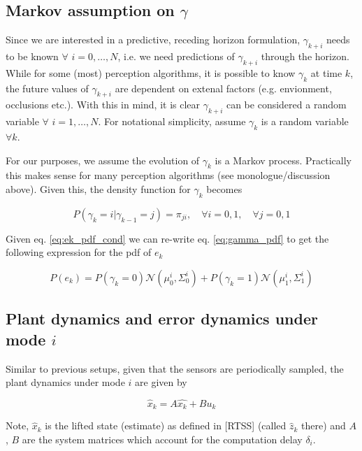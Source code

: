 \documentclass{article}[14pt]
\begin{document}
	\subsection{Markov assumption on $\gamma$}

	Since we are interested in a predictive, receding horizon formulation, $\gamma_{k+i}$ needs to be known $\forall$ $i=0,\dotsc,N$, i.e. we need predictions of $\gamma_{k+i}$ through the horizon. While for some (most) perception algorithms, it is possible to know $\gamma_k$ at time $k$, the future values of $\gamma_{k+i}$ are dependent on extenal factors (e.g. envionment, occlusions etc.). With this in mind, it is clear $\gamma_{k+i}$ can be considered a random variable $\forall$ $i=1,\dotsc,N$. For notational simplicity, assume $\gamma_k$ is a random variable $\forall k$. 

	For our purposes, we assume the evolution of $\gamma_k$ is a Markov process. Practically this makes sense for many perception algorithms (see monologue/discussion above). Given this, the density function for $\gamma_k$ becomes

	\begin{equation}
		P(\gamma_k=i|\gamma_{k-1}=j) = \pi_{ji}, \quad \forall i=0,1,\quad \forall j=0,1
		\label{eq:gamma_pdf}
	\end{equation}

	Given eq. \ref{eq:ek_pdf_cond} we can re-write eq. \ref{eq:gamma_pdf} to get the following expression for the pdf of $e_k$

	\begin{equation}
		P(e_k) = P(\gamma_k=0)\mathcal{N}(\mu^i_0,\Sigma^i_0) + P(\gamma_k=1)\mathcal{N}(\mu^i_1,\Sigma^i_1)
		\label{eq:ek_pdf_exp}
	\end{equation}

	\subsection{Plant dynamics and error dynamics under mode $i$}
	Similar to previous setups, given that the sensors are periodically sampled, the plant dynamics under mode $i$ are given by

	\begin{equation}
		\hat{x}_k = A\hat{x_k} + Bu_k
		\label{eq:est_dynamics_simple}
	\end{equation}

	Note, $\hat{x}_k$ is the lifted state (estimate) as defined in [RTSS] (called $\hat{z}_k$ there) and $A$, $B$ are the system matrices which account for the computation delay $\delta_i$. 
\end{document}
